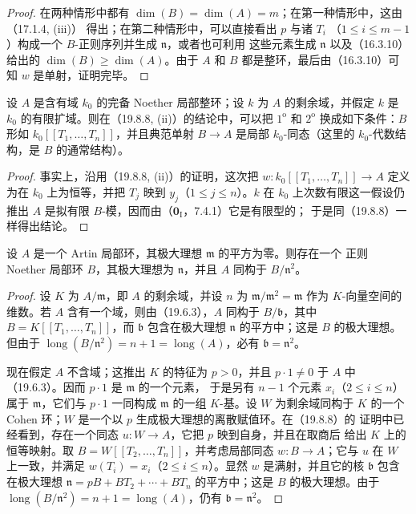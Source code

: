 \begin{proof}

在两种情形中都有 $\dim(B)=\dim(A)=m$；在第一种情形中，这由（17.1.4, (iii)）
得出；在第二种情形中，可以直接看出 $p$ 与诸 $T_i$
（$1\leq i\leq m-1$）构成一个 $B$-正则序列并生成 $\mathfrak n$，或者也可利用
这些元素生成 $\mathfrak n$ 以及（16.3.10）给出的
$\dim(B)\geq\dim(A)$。由于 $A$ 和 $B$ 都是整环，最后由（16.3.10）可知 $w$
是单射，证明完毕。
\end{proof}

\begin{corollary}[19.8.9]
\label{0.19.8.9-fr}
设 $A$ 是含有域 $k_0$ 的完备 Noether 局部整环；设 $k$ 为 $A$ 的剩余域，并假定
$k$ 是 $k_0$ 的有限扩域。则在（19.8.8, (ii)）的结论中，可以把
$1^{\mathrm o}$ 和 $2^{\mathrm o}$ 换成如下条件：$B$ 形如
$k_0[[T_1,\ldots,T_n]]$，并且典范单射 $B\to A$ 是局部
$k_0$-同态（这里的 $k_0$-代数结构，是 $B$ 的通常结构）。
\end{corollary}

\begin{proof}
事实上，沿用（19.8.8, (ii)）的证明，这次把
$w:k_0[[T_1,\ldots,T_n]]\to A$ 定义为在 $k_0$ 上为恒等，并把
$T_j$ 映到 $y_j$（$1\leq j\leq n$）。$k$ 在 $k_0$ 上次数有限这一假设仍推出
$A$ 是拟有限 $B$-模，因而由（$\mathbf 0_{\mathrm I}$，7.4.1）它是有限型的；
于是同（19.8.8）一样得出结论。
\end{proof}

\begin{corollary}[19.8.10]
\label{0.19.8.10-fr}
设 $A$ 是一个 Artin 局部环，其极大理想 $\mathfrak m$ 的平方为零。则存在一个
正则 Noether 局部环 $B$，其极大理想为 $\mathfrak n$，并且
$A$ 同构于 $B/\mathfrak n^2$。
\end{corollary}

\begin{proof}
设 $K$ 为 $A/\mathfrak m$，即 $A$ 的剩余域，并设 $n$ 为
$\mathfrak m/\mathfrak m^2=\mathfrak m$ 作为 $K$-向量空间的维数。若 $A$
含有一个域，则由（19.6.3），$A$ 同构于 $B/\mathfrak b$，其中
$B=K[[T_1,\ldots,T_n]]$，而 $\mathfrak b$ 包含在极大理想
$\mathfrak n$ 的平方中；这是 $B$ 的极大理想。但由于
$\operatorname{long}(B/\mathfrak n^2)=n+1=\operatorname{long}(A)$，必有
$\mathfrak b=\mathfrak n^2$。

现在假定 $A$ 不含域；这推出 $K$ 的特征为 $p>0$，并且
$p\cdot1\neq0$ 于 $A$ 中（19.6.3）。因而 $p\cdot1$ 是 $\mathfrak m$ 的一个元素，
于是另有 $n-1$ 个元素 $x_i$（$2\leq i\leq n$）属于 $\mathfrak m$，它们与
$p\cdot1$ 一同构成 $\mathfrak m$ 的一组 $K$-基。设 $W$ 为剩余域同构于 $K$
的一个 Cohen 环；$W$ 是一个以 $p$ 生成极大理想的离散赋值环。在（19.8.8）的
证明中已经看到，存在一个同态 $u:W\to A$，它把 $p$ 映到自身，并且在取商后
给出 $K$ 上的恒等映射。取 $B=W[[T_2,\ldots,T_n]]$，并考虑局部同态
$w:B\to A$；它与 $u$ 在 $W$ 上一致，并满足
$w(T_i)=x_i$（$2\leq i\leq n$）。显然 $w$ 是满射，并且它的核
$\mathfrak b$ 包含在极大理想
$\mathfrak n=pB+BT_2+\cdots+BT_n$ 的平方中；这是 $B$ 的极大理想。由于
$\operatorname{long}(B/\mathfrak n^2)=n+1=\operatorname{long}(A)$，仍有
$\mathfrak b=\mathfrak n^2$。
\end{proof}

